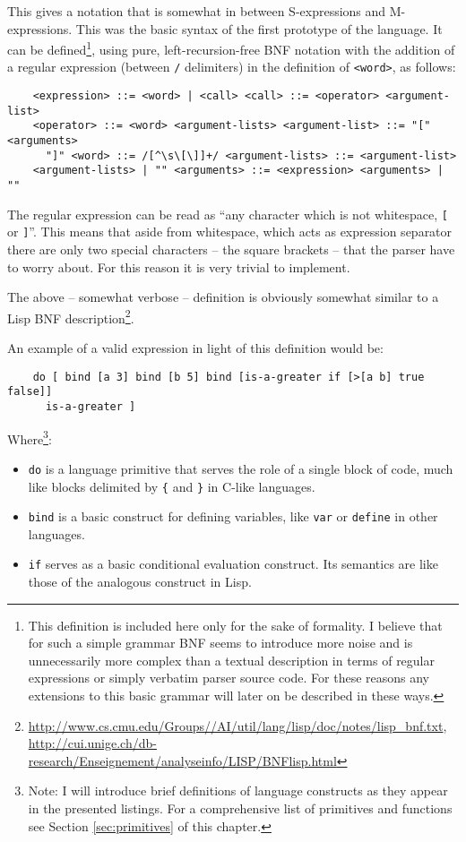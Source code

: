This gives a notation that is somewhat in between S-expressions and
M-expressions. This was the basic syntax of the first prototype of the
language. It can be defined\footnote{This definition is included here only for
  the sake of formality. I believe that for such a simple grammar BNF seems to
  introduce more noise and is unnecessarily more complex than a textual
  description in terms of regular expressions or simply verbatim parser source
  code. For these reasons any extensions to this basic grammar will later on be
  described in these ways.}, using pure, left-recursion-free BNF notation with
the addition of a regular expression (between \texttt{/} delimiters) in the
definition of \texttt{<word>}, as follows:
\begin{lstlisting}
    <expression> ::= <word> | <call> <call> ::= <operator> <argument-list>
    <operator> ::= <word> <argument-lists> <argument-list> ::= "[" <arguments>
      "]" <word> ::= /[^\s\[\]]+/ <argument-lists> ::= <argument-list>
    <argument-lists> | "" <arguments> ::= <expression> <arguments> | ""
\end{lstlisting}

The regular expression can be read as ``any character which is not whitespace,
\texttt{[} or \texttt{]}''. This means that aside from whitespace, which acts as
expression separator there are only two special characters -- the square
brackets -- that the parser have to worry about. For this reason it is very
trivial to implement.

The above -- somewhat verbose -- definition is obviously somewhat similar to a
Lisp BNF
description\footnote{\url{http://www.cs.cmu.edu/Groups//AI/util/lang/lisp/doc/notes/lisp_bnf.txt},
  \url{http://cui.unige.ch/db-research/Enseignement/analyseinfo/LISP/BNFlisp.html}}.

An example of a valid expression in light of this definition would be:
\begin{lstlisting}
    do [ bind [a 3] bind [b 5] bind [is-a-greater if [>[a b] true false]]
      is-a-greater ]
\end{lstlisting}

Where\footnote{Note: I will introduce brief definitions of language constructs
  as they appear in the presented listings. For a comprehensive list of
  primitives and functions see Section \ref{sec:primitives} of this chapter.}:
\begin{itemize}
    \item \texttt{do} is a language primitive that serves the role of a single
      block of code, much like blocks delimited by \texttt{\{} and \texttt{\}}
      in C-like languages.
    \item \texttt{bind} is a basic construct for defining variables, like
      \texttt{var} or \texttt{define} in other languages.
    \item \texttt{if} serves as a basic conditional evaluation construct. Its
      semantics are like those of the analogous construct in Lisp.
\end{itemize}

